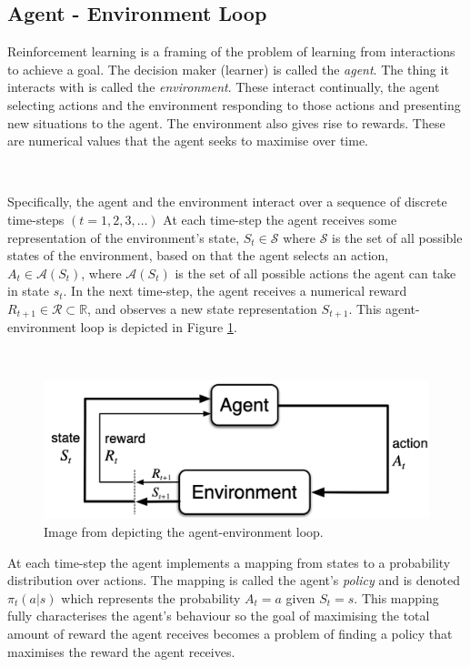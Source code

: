 \documentclass{article}
\begin{document}
\subsection{Agent - Environment Loop}

Reinforcement learning is a framing of the problem of learning from interactions to achieve a goal. The decision maker (learner) is called the \textit{agent}. The thing it interacts with is called the \textit{environment}. These interact continually, the agent selecting actions and the environment responding to those actions and presenting new situations to the agent. The environment also gives rise to rewards. These are numerical values that the agent seeks to maximise over time.

\

Specifically, the agent and the environment interact over a sequence of discrete time-steps $(t = 1, 2, 3, \hdots)$ At each time-step the agent receives some representation of the environment's state, $S_t \in \mathcal{S}$ where $\mathcal{S}$ is the set of all possible states of the environment, based on that the agent selects an action, $A_t \in \mathcal{A}(S_t)$, where $\mathcal{A}(S_t)$ is the set of all possible actions the agent can take in state $s_t$. In the next time-step, the agent receives a numerical reward $R_{t+1} \in \mathcal{R} \subset \mathbb{R}$, and observes a new state representation $S_{t+1}$. This agent-environment loop is depicted in Figure \ref{fig:agent_environment}. 

\

\begin{figure}
	\centering
	\includegraphics[scale=0.6]{images/agent_environment.png}
	\caption{Image from \citet{sutton2018reinforcement} depicting the agent-environment loop.}
	\label{fig:agent_environment}
\end{figure}

At each time-step the agent implements a mapping from states to a probability distribution over actions. The mapping is called the agent's \textit{policy} and is denoted $\pi_t(a | s)$ which represents the probability $A_t = a$ given $S_t = s$. This mapping fully characterises the agent's behaviour \citep{silver2015rl} so the goal of maximising the total amount of reward the agent receives becomes a problem of finding a policy that maximises the reward the agent receives. 
\end{document}
